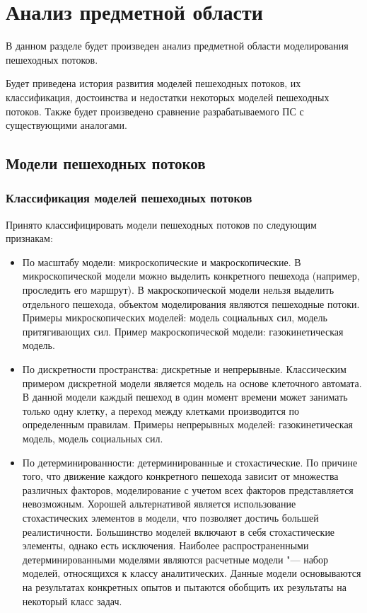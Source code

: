 \section{Анализ предметной области}
\label{sec:domain}

В данном разделе будет произведен анализ предметной области моделирования пешеходных потоков.

Будет приведена история развития моделей пешеходных потоков, их классификация, достоинства и недостатки некоторых моделей пешеходных потоков.
Также будет произведено сравнение разрабатываемого ПС с существующими аналогами.

\subsection{Модели пешеходных потоков}
\label{sub:domain:models}

\subsubsection{Классификация моделей пешеходных потоков}
\label{sub:domain:models:classification}

Принято классифицировать модели пешеходных потоков по следующим признакам:

\begin{itemize}
  \item По масштабу модели: микроскопические и макроскопические.
        В микроскопической модели можно выделить конкретного пешехода (например, проследить его маршрут).
        В макроскопической модели нельзя выделить отдельного пешехода, объектом моделирования являются пешеходные потоки.
        Примеры микроскопических моделей: модель социальных сил, модель притягивающих сил.
        Пример макроскопической модели: газокинетическая модель.
  \item По дискретности пространства: дискретные и непрерывные.
        Классическим примером дискретной модели является модель на основе клеточного автомата. В данной модели каждый пешеход в один момент времени может занимать только одну клетку, а переход между клетками производится по определенным правилам.
        Примеры непрерывных моделей: газокинетическая модель, модель социальных сил.
  \item По детерминированности: детерминированные и стохастические.
        По причине того, что движение каждого конкретного пешехода зависит от множества различных факторов, моделирование с учетом всех факторов представляется невозможным.
        Хорошей альтернативой является использование стохастических элементов в модели, что позволяет достичь большей реалистичности.
        Большинство моделей включают в себя стохастические элементы, однако есть исключения.
        Наиболее распространенными детерминированными моделями являются расчетные модели "--- набор моделей, относящихся к классу аналитических.
        Данные модели основываются на результатах конкретных опытов и пытаются обобщить их результаты на некоторый класс задач.
\end{itemize}

